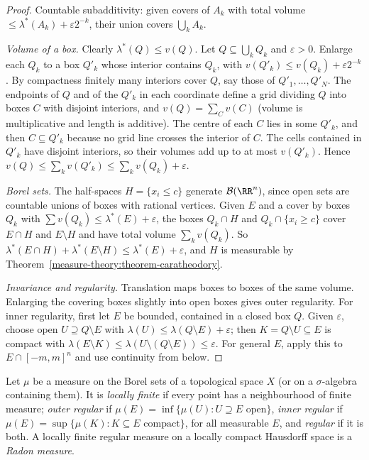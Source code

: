 \begin{proof}
Countable subadditivity: given covers of $A_k$ with total volume $\leq \lambda^*(A_k) + \varepsilon2^{-k}$, their union covers $\bigcup_kA_k$.

\emph{Volume of a box.} Clearly $\lambda^*(Q) \leq v(Q)$. Let $Q \subseteq \bigcup_kQ_k$ and $\varepsilon > 0$. Enlarge each $Q_k$ to a box $Q'_k$ whose interior contains $Q_k$, with
$v(Q'_k) \leq v(Q_k) + \varepsilon2^{-k}$. By compactness finitely many interiors cover $Q$, say those of $Q'_1, \ldots, Q'_N$. The endpoints of $Q$ and of the $Q'_k$ in each coordinate define a grid
dividing $Q$ into boxes $C$ with disjoint interiors, and $v(Q) = \sum_Cv(C)$ (volume is multiplicative and length is additive). The centre of each $C$ lies in some $Q'_k$, and then $C \subseteq Q'_k$ because
no grid line crosses the interior of $C$. The cells contained in $Q'_k$ have disjoint interiors, so their volumes add up to at most $v(Q'_k)$. Hence $v(Q) \leq \sum_kv(Q'_k) \leq \sum_kv(Q_k) + \varepsilon$.

\emph{Borel sets.} The half-spaces $H = \{x_i \leq c\}$ generate $\mathcal{B}(\RR^n)$, since open sets are countable unions of boxes with rational vertices. Given $E$ and a cover by boxes $Q_k$ with
$\sum v(Q_k) \leq \lambda^*(E) + \varepsilon$, the boxes $Q_k \cap H$ and $Q_k \cap \{x_i \geq c\}$ cover $E \cap H$ and $E \setminus H$ and have total volume $\sum_kv(Q_k)$. So
$\lambda^*(E \cap H) + \lambda^*(E \setminus H) \leq \lambda^*(E) + \varepsilon$, and $H$ is measurable by Theorem~\ref{measure-theory:theorem-caratheodory}.

\emph{Invariance and regularity.} Translation maps boxes to boxes of the same volume. Enlarging the covering boxes slightly into open boxes gives outer regularity. For inner regularity, first let $E$ be bounded, contained in a
closed box $Q$. Given $\varepsilon$, choose open $U \supseteq Q \setminus E$ with $\lambda(U) \leq \lambda(Q \setminus E) + \varepsilon$; then $K = Q \setminus U \subseteq E$ is compact with
$\lambda(E \setminus K) \leq \lambda(U \setminus (Q \setminus E)) \leq \varepsilon$. For general $E$, apply this to $E \cap [-m, m]^n$ and use continuity from below.
\end{proof}

\begin{definition}\label{measure-theory:definition-regular}
Let $\mu$ be a measure on the Borel sets of a topological space $X$ (or on a $\sigma$-algebra containing them). It is \emph{locally finite} if every point has a neighbourhood of finite measure;
\emph{outer regular} if $\mu(E) = \inf\{\mu(U) : U \supseteq E \text{ open}\}$, \emph{inner regular} if $\mu(E) = \sup\{\mu(K) : K \subseteq E \text{ compact}\}$, for all measurable $E$, and
\emph{regular} if it is both. A locally finite regular measure on a locally compact Hausdorff space is a \emph{Radon measure}.
\end{definition}

